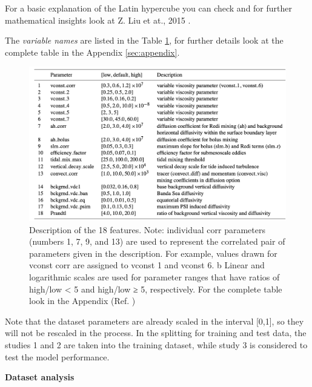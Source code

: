 \documentclass[english,notitlepage,reprint,nofootinbib]{revtex4-1}  %
\begin{document}
For a basic explanation of the Latin hypercube you can check \cite{latinwiki} and for further mathematical insights look at Z. Liu et at., 2015 \cite{latin}.

The \textit{variable names} are listed in the Table \ref{fig:big_table}, for further details look at the complete table in the Appendix \ref{sec:appendix}.

\begin{figure}[h]
    \centering 
    \includegraphics[scale=0.35]{img/big_table.png}
    \caption{Description of the 18 features. Note: individual corr parameters (numbers 1, 7, 9, and 13) are used to represent the correlated pair of parameters given in the description. For example, values drawn for vconst corr are assigned to vconst 1 and vconst 6. b Linear and logarithmic scales are used for parameter ranges that have ratios of high/low < 5 and high/low ≥ 5, respectively. For the complete table look in the Appendix (Ref. \cite{failure})}
    \label{fig:big_table}
\end{figure}

Note that the dataset parameters are already scaled in the interval [0,1], so they will not be rescaled in the process. In the splitting for training and test data, the studies 1 and 2 are taken into the training dataset, while study 3 is considered to test the model performance.

\textbf{Dataset analysis}
\end{document}
